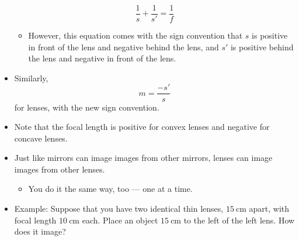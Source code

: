 \documentclass[../notes.tex]{subfiles}
\begin{document}
\begin{itemize}
    \begin{equation*}
        \frac{1}{s}+\frac{1}{s'} = \frac{1}{f}
    \end{equation*}
    \begin{itemize}
        \item However, this equation comes with the sign convention that $s$ is positive in front of the lens and negative behind the lens, and $s'$ is positive behind the lens and negative in front of the lens.
    \end{itemize}
    \item Similarly,
    \begin{equation*}
        m = \frac{-s'}{s}
    \end{equation*}
    for lenses, with the new sign convention.
    \item Note that the focal length is positive for convex lenses and negative for concave lenses.
    \item Just like mirrors can image images from other mirrors, lenses can image images from other lenses.
    \begin{itemize}
        \item You do it the same way, too --- one at a time.
    \end{itemize}
    \item Example: Suppose that you have two identical thin lenses, $\SI{15}{\centi\meter}$ apart, with focal length $\SI{10}{\centi\meter}$ each. Place an object $\SI{15}{\centi\meter}$ to the left of the left lens. How does it image?
    \begin{figure}[h!]
        \centering
\end{figure}
\end{itemize}
\end{document}
